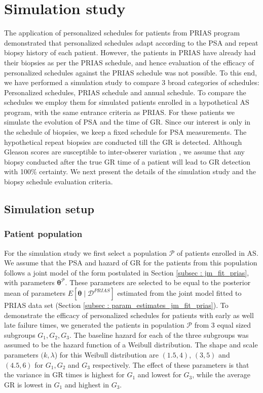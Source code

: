 
\section{Simulation study}
\label{sec: simulation_study}
The application of personalized schedules for patients from PRIAS program demonstrated that personalized schedules adapt according to the PSA and repeat biopsy history of each patient. However, the patients in PRIAS have already had their biopsies as per the PRIAS schedule, and hence evaluation of the efficacy of personalized schedules against the PRIAS schedule was not possible. To this end, we have performed a simulation study to compare 3 broad categories of schedules: Personalized schedules, PRIAS schedule and annual schedule. To compare the schedules we employ them for simulated patients enrolled in a hypothetical AS program, with the same entrance criteria as PRIAS. For these patients we simulate the evolution of PSA and the time of GR. Since our interest is only in the schedule of biopsies, we keep a fixed schedule for PSA measurements. The hypothetical repeat biopsies are conducted till the GR is detected. Although Gleason scores are susceptible to inter-obserer variation \citep{Gleason_interobs_var}, we assume that any biopsy conducted after the true GR time of a patient will lead to GR detection with 100\% certainty. We next present the details of the simulation study and the biopsy schedule evaluation criteria.

\subsection{Simulation setup}
\label{subsec : simulation_setup}
\subsubsection{Patient population}
For the simulation study we first select a population $\mathcal{P}$ of patients enrolled in AS. We assume that the PSA and hazard of GR for the patients from this population follows a joint model of the form postulated in Section \ref{subsec : jm_fit_prias}, with parameters $\boldsymbol{\theta}^{\mathcal{P}}$. These parameters are selected to be equal to the posterior mean of parameters $E[\boldsymbol{\theta} \mid \mathcal{D}^{PRIAS}]$ estimated from the joint model fitted to PRIAS data set (Section \ref{subsec : param_estimates_jm_fit_prias}). To demonstrate the efficacy of personalized schedules for patients with early as well late failure times, we generated the patients in population $\mathcal{P}$ from 3 equal sized subgroups $G_1, G_2, G_3$. The baseline hazard for each of the three subgroups was assumed to be the hazard function of a Weibull distribution. The shape and scale parameters $(k, \lambda$) for this Weibull distribution are $(1.5, 4)$, $(3, 5)$ and $(4.5, 6)$ for $G_1, G_2$ and $G_3$ respectively. The effect of these parameters is that the variance in GR times is highest for $G_1$ and lowest for $G_3$, while the average GR is lowest in $G_1$ and highest in $G_3$.

